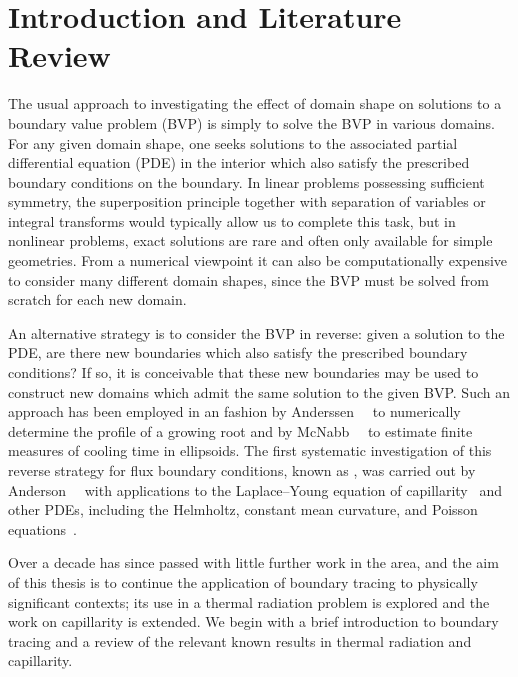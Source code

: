 \chapter{Introduction and Literature Review}
\label{ch:introduction}

The usual approach
to investigating the effect of domain shape
on solutions to a boundary value problem (BVP)
is simply to solve the BVP in various domains.
For any given domain shape, one seeks solutions
to the associated partial differential equation (PDE) in the interior
which also satisfy the prescribed boundary conditions on the boundary.
In linear problems possessing sufficient symmetry,
the superposition principle
together with separation of variables or integral transforms
would typically allow us to complete this task,
but in nonlinear problems,
exact solutions are rare and often only available for simple geometries.
From a numerical viewpoint
it can also be computationally expensive
to consider many different domain shapes,
since the BVP must be solved from scratch for each new domain.

An alternative strategy is to
consider the BVP in reverse:
given a solution to the PDE\@, are there new boundaries
which also satisfy the prescribed boundary conditions?
If so, it is conceivable that these new boundaries may be used
to construct new domains
which admit the same solution to the given BVP\@.
Such an approach has been employed in an \adhoc{} fashion
by Anderssen~\etal~\cite{anderssen-1969-ion-uptake-growing-roots}
to numerically determine the profile of a growing root
and by McNabb~\etal~\cite{mcnabb-1991-theoretical-derivation-freezing-times}
to estimate finite measures of cooling time in ellipsoids.
The first systematic investigation of this
reverse strategy for flux boundary conditions,
known as ,
was carried out by
Anderson~\etal~\cite{anderson-2007-boundary-tracing-i-theory}
with applications to the Laplace--Young equation
of capillarity~\cite{anderson-2006-exact-solutions-laplace-young}
and other PDEs, including the Helmholtz,
constant mean curvature, and
Poisson equations~\cite{anderson-2007-boundary-tracing-ii-applications}.

Over a decade has since passed
with little further work in the area,
and the aim of this thesis is to
continue the application of boundary tracing
to physically significant contexts;
its use in a thermal radiation problem is explored
and the work on capillarity is extended.
We begin with a brief introduction to boundary tracing
and a review of the relevant known results
in thermal radiation and capillarity.

